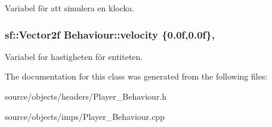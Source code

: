 Variabel för att simulera en klocka. 

\hypertarget{classBehaviour_a1d52096cf20a59890f7705acbaccf88a}{
\subsubsection[{velocity}]{\setlength{\rightskip}{0pt plus 5cm}sf\+::\+Vector2f Behaviour\+::velocity \{0.\+0f,0.\+0f\}\hspace{0.3cm}{\ttfamily [protected]}, {\ttfamily [inherited]}}}\label{classBehaviour_a1d52096cf20a59890f7705acbaccf88a}


Variabel for hastigheten för entiteten. 



The documentation for this class was generated from the following files\+:\begin{DoxyCompactItemize}
\item 
source/objects/headers/Player\+\_\+\+Behaviour.\+h\item 
source/objects/imps/Player\+\_\+\+Behaviour.\+cpp\end{DoxyCompactItemize}
